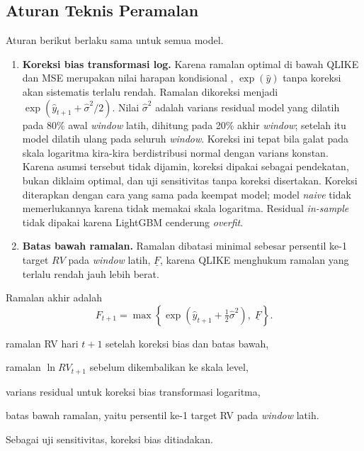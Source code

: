 \subsection{Aturan Teknis Peramalan}
\label{subsec:teknis}
Aturan berikut berlaku sama untuk semua model.
\begin{enumerate}
  \item \textbf{Koreksi bias transformasi log.} Karena ramalan optimal di
        bawah QLIKE dan MSE merupakan nilai harapan kondisional
        \cite{patton2011}, $\exp(\hat y)$ tanpa koreksi akan sistematis
        terlalu rendah. Ramalan dikoreksi menjadi
        $\exp(\hat y_{t+1} + \hat\sigma^2/2)$. Nilai $\hat\sigma^2$ adalah
        varians residual model yang dilatih pada 80\% awal \textit{window}
        latih, dihitung pada 20\% akhir \textit{window}; setelah itu model
        dilatih ulang pada seluruh \textit{window}. Koreksi ini tepat bila
        galat pada skala logaritma kira-kira berdistribusi normal dengan
        varians konstan. Karena asumsi tersebut tidak dijamin, koreksi dipakai
        sebagai pendekatan, bukan diklaim optimal, dan uji sensitivitas tanpa
        koreksi disertakan. Koreksi diterapkan dengan cara yang sama pada
        keempat model; model \textit{naive} tidak memerlukannya karena tidak
        memakai skala logaritma. Residual
        \textit{in-sample} tidak dipakai karena LightGBM cenderung
        \textit{overfit}.
  \item \textbf{Batas bawah ramalan.} Ramalan dibatasi minimal sebesar
        persentil ke-1 target $RV$ pada \textit{window} latih,
        $\underline{F}$, karena QLIKE menghukum ramalan yang terlalu rendah
        jauh lebih berat.
\end{enumerate}

Ramalan akhir adalah
\begin{equation}
  F_{t+1} = \max\!\left\{
    \exp\!\left(\hat y_{t+1} + \tfrac{1}{2}\hat\sigma^2\right),\;
    \underline{F} \right\}.
  \label{eq:ramalan}
\end{equation}
\begin{keterangan}
  \item[$F_{t+1}$] ramalan RV hari $t+1$ setelah koreksi bias dan batas bawah,
  \item[$\hat{y}_{t+1}$] ramalan $\ln RV_{t+1}$ sebelum dikembalikan ke skala
    level,
  \item[$\hat{\sigma}^2$] varians residual untuk koreksi bias transformasi
    logaritma,
  \item[$\underline{F}$] batas bawah ramalan, yaitu persentil ke-1 target RV
    pada \textit{window} latih.
\end{keterangan}
Sebagai uji sensitivitas, koreksi bias ditiadakan.

